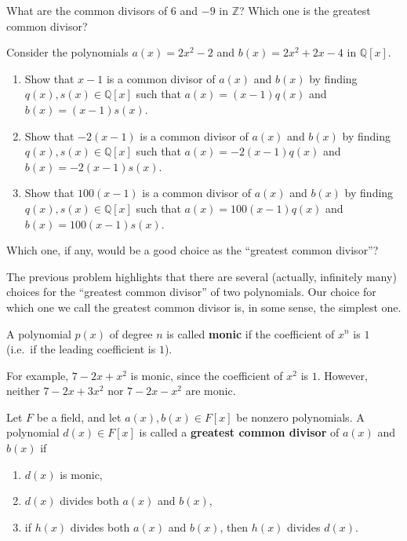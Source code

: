 \begin{problem}
What are the common divisors of $6$ and $-9$ in $\mathbb{Z}$? Which one is the greatest common divisor?
\end{problem}

\begin{problem}\label{prob.GCDExlore}
Consider the polynomials $a(x) = 2x^2-2$ and $b(x) = 2x^2+2x-4$ in $\mathbb{Q}[x]$.
\begin{enumerate}
\item Show that $x-1$ is a common divisor of $a(x)$ and $b(x)$ by finding  $q(x),s(x)\in \mathbb{Q}[x]$ such that $a(x) = (x-1)q(x)$ and $b(x) = (x-1)s(x)$.
\item Show that $-2(x-1)$ is a common divisor of $a(x)$ and $b(x)$ by finding  $q(x),s(x)\in \mathbb{Q}[x]$  such that $a(x) = -2(x-1)q(x)$ and $b(x) = -2(x-1)s(x)$.
\item Show that $100(x-1)$ is a common divisor of $a(x)$ and $b(x)$ by finding  $q(x),s(x)\in \mathbb{Q}[x]$ such that $a(x) = 100(x-1)q(x)$ and $b(x) = 100(x-1)s(x)$.
\end{enumerate}
Which one, if any, would be a good choice as the ``greatest common divisor''?
\end{problem}

The previous problem highlights that there are several (actually, infinitely many) choices for the ``greatest common divisor'' of two polynomials. Our choice for which one we call the greatest common divisor is, in some sense, the simplest one.

\begin{definition}
A polynomial $p(x)$ of degree $n$ is called \textbf{monic} if the coefficient of $x^n$ is $1$ (i.e.~if the leading coefficient is $1$).
\end{definition}

For example, $7-2x+x^2$ is monic, since the coefficient of $x^2$ is $1$. However, neither $7-2x+3x^2$ nor $7-2x-x^2$ are monic.

\begin{definition}
Let $F$ be a field, and let $a(x), b(x)\in F[x]$ be nonzero polynomials. A polynomial $d(x)\in F[x]$ is called a \textbf{greatest common divisor} of $a(x)$ and $b(x)$ if
\begin{enumerate}
\item $d(x)$ is monic,
\item $d(x)$ divides both $a(x)$ and $b(x)$,
\item if $h(x)$ divides both $a(x)$ and $b(x)$, then $h(x)$ divides $d(x)$.
\end{enumerate}
\end{definition}

